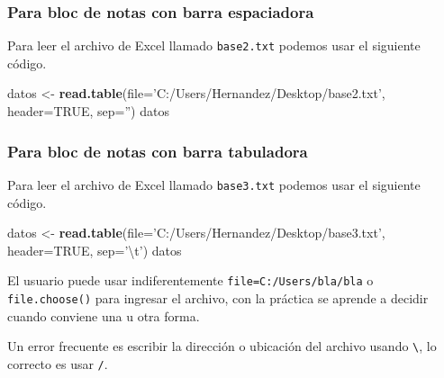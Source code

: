 \documentclass[10pt,]{krantz}
\makeatletter
\newenvironment{Shaded}{\begin{snugshade}}{\end{snugshade}}
\newcommand{\KeywordTok}[1]{\textcolor[rgb]{0.13,0.29,0.53}{\textbf{{#1}}}}
\newcommand{\DataTypeTok}[1]{\textcolor[rgb]{0.13,0.29,0.53}{{#1}}}
\newcommand{\CharTok}[1]{\textcolor[rgb]{0.31,0.60,0.02}{{#1}}}
\newcommand{\StringTok}[1]{\textcolor[rgb]{0.31,0.60,0.02}{{#1}}}
\newcommand{\OtherTok}[1]{\textcolor[rgb]{0.56,0.35,0.01}{{#1}}}
\newcommand{\NormalTok}[1]{{#1}}
\newenvironment{kframe}{%
\medskip{}
\setlength{\fboxsep}{.8em}
 \def\at@end@of@kframe{}%
 \ifinner\ifhmode%
  \def\at@end@of@kframe{\end{minipage}}%
  \begin{minipage}{\columnwidth}%
 \fi\fi%
 \def\FrameCommand##1{\hskip\@totalleftmargin \hskip-\fboxsep
 \colorbox{shadecolor}{##1}\hskip-\fboxsep
     \hskip-\linewidth \hskip-\@totalleftmargin \hskip\columnwidth}%
 \MakeFramed {\advance\hsize-\width
   \@totalleftmargin\z@ \linewidth\hsize
   \@setminipage}}%
 {\par\unskip\endMakeFramed%
 \at@end@of@kframe}
\renewenvironment{Shaded}{\begin{kframe}}{\end{kframe}}
\let\BeginKnitrBlock\begin \let\EndKnitrBlock\end
\makeatother
\begin{document}
\subsubsection*{Para bloc de notas con barra
espaciadora}\label{para-bloc-de-notas-con-barra-espaciadora}

Para leer el archivo de Excel llamado \texttt{base2.txt} podemos usar el
siguiente código.

\begin{Shaded}
\begin{Highlighting}[]
\NormalTok{datos <-}\StringTok{ }\KeywordTok{read.table}\NormalTok{(}\DataTypeTok{file=}\StringTok{'C:/Users/Hernandez/Desktop/base2.txt'}\NormalTok{,}
                    \DataTypeTok{header=}\OtherTok{TRUE}\NormalTok{, }\DataTypeTok{sep=}\StringTok{''}\NormalTok{)}
\NormalTok{datos}
\end{Highlighting}
\end{Shaded}

\subsubsection*{Para bloc de notas con barra
tabuladora}\label{para-bloc-de-notas-con-barra-tabuladora}

Para leer el archivo de Excel llamado \texttt{base3.txt} podemos usar el
siguiente código.

\begin{Shaded}
\begin{Highlighting}[]
\NormalTok{datos <-}\StringTok{ }\KeywordTok{read.table}\NormalTok{(}\DataTypeTok{file=}\StringTok{'C:/Users/Hernandez/Desktop/base3.txt'}\NormalTok{,}
                    \DataTypeTok{header=}\OtherTok{TRUE}\NormalTok{, }\DataTypeTok{sep=}\StringTok{'}\CharTok{\textbackslash{}t}\StringTok{'}\NormalTok{)}
\NormalTok{datos}
\end{Highlighting}
\end{Shaded}

\BeginKnitrBlock{rmdnote}
El usuario puede usar indiferentemente
\texttt{file=\textquotesingle{}C:/Users/bla/bla\textquotesingle{}} o
\texttt{file.choose()} para ingresar el archivo, con la práctica se
aprende a decidir cuando conviene una u otra forma.
\EndKnitrBlock{rmdnote}

\BeginKnitrBlock{rmdwarning}
Un error frecuente es escribir la dirección o ubicación del archivo
usando \texttt{\textbackslash{}}, lo correcto es usar \texttt{/}.
\EndKnitrBlock{rmdwarning}
\end{document}
